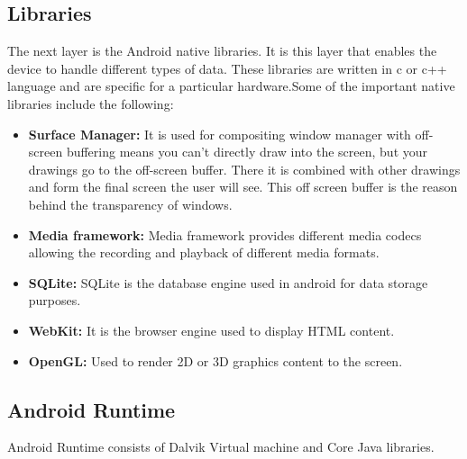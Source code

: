 \subsection{Libraries}
The next layer is the Android native libraries. It is this layer that enables the device to handle different types of data. These libraries are written in c or c++ language and are specific for a particular hardware.Some of the important native libraries include the following: 
\begin{itemize}

  \item \textbf{Surface Manager:} It is used for compositing window manager with off-screen buffering means you can't directly draw into the screen, but your drawings go to the off-screen buffer. There it is combined with other drawings and form the final screen the user will see. This off screen buffer is the reason behind the transparency of windows.

  \item \textbf{Media framework:} Media framework provides different media codecs allowing the recording and playback of different media formats.

  \item \textbf {SQLite:} SQLite is the database engine used in android for data storage purposes.

  \item \textbf{WebKit:} It is the browser engine used to display HTML content.

  \item\textbf{ OpenGL:} Used to render 2D or 3D graphics content to the screen.

  

\end{itemize}



\subsection{Android Runtime}

Android Runtime consists of Dalvik Virtual machine and Core Java libraries. 

